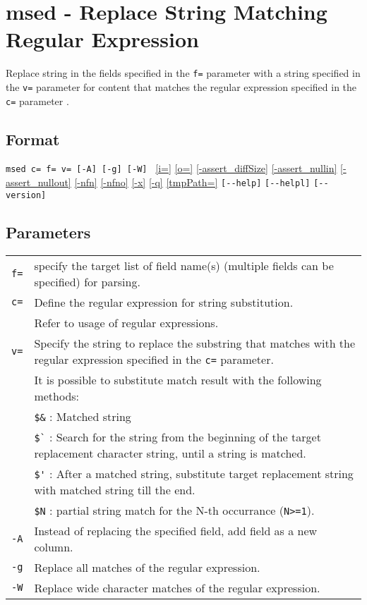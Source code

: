 
%

\section{msed - Replace String Matching Regular Expression\label{sect:msed}}
Replace string in the fields specified in the \verb|f=| parameter with a string specified in the \verb|v=| parameter for content that matches the regular expression specified in the \verb|c=| parameter . 


\subsection*{Format}
\verb|msed c= f= v= [-A] [-g] [-W] |     
\hyperref[sect:option_i]{[i=]}
\hyperref[sect:option_o]{[o=]}
\hyperref[sect:option_assert_diffSize]{[-assert\_diffSize]}
\hyperref[sect:option_assert_nullin]{[-assert\_nullin]}
\hyperref[sect:option_assert_nullout]{[-assert\_nullout]}
\hyperref[sect:option_nfn]{[-nfn]} 
\hyperref[sect:option_nfno]{[-nfno]}  
\hyperref[sect:option_x]{[-x]}
\hyperref[sect:option_q]{[-q]}
\hyperref[sect:option_option_tmppath]{[tmpPath=]}
\verb|[--help]|
\verb|[--helpl]|
\verb|[--version]|\\

\subsection*{Parameters}
\begin{table}[htbp]
{\small
\begin{tabular}{ll}
\verb|f=|  & specify the target list of field name(s) (multiple fields can be specified) for parsing.\\
\verb|c=|  & Define the regular expression for string substitution. \\
           & Refer to usage of  regular expressions.\\
\verb|v=|  & Specify the string to replace the substring that matches with the regular expression specified in the \verb|c=| parameter. \\
           & It is possible to substitute match result with the following methods: \\
           & \verb|$&| : Matched string\\
           & \verb|$`| : Search for the string from the beginning of the target replacement character string, until a  string is matched. \\
           & \verb|$'| : After a matched string, substitute target replacement string with matched string till the end. \\
           & \verb|$N| : partial string match for the N-th occurrance (\verb|N>=1|).\\
\verb|-A|  & Instead of replacing the specified field, add field as a new column. \\
\verb|-g|  & Replace all matches of the regular expression. \\
\verb|-W|  & Replace wide character matches of the regular expression. \\
\end{tabular} 
}
\end{table} 


